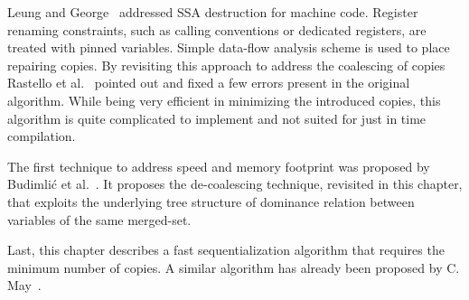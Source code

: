 Leung and George~\cite{leung:1999:ssa_mach} addressed SSA destruction for machine code.
Register renaming constraints, such as calling conventions or dedicated registers, are treated with pinned variables.
Simple data-flow analysis scheme is used to place repairing copies.
By revisiting this approach to address the coalescing of copies Rastello et al.~\cite{Rastello:2004:CGO} pointed out and fixed a few errors present in the original algorithm. While being very efficient in minimizing the introduced copies, this algorithm is quite complicated to implement and not suited for just in time compilation.

The first technique to address speed and memory footprint was proposed by Budimli\'{c} et al.~\cite{Budimlic02}. 
It proposes the de-coalescing technique, revisited in this chapter, that exploits the underlying tree structure of dominance relation between variables of the same merged-set.

Last, this chapter describes a fast sequentialization algorithm that requires the minimum number of copies.
A similar algorithm has already been proposed by C. May~\cite{May89}.

